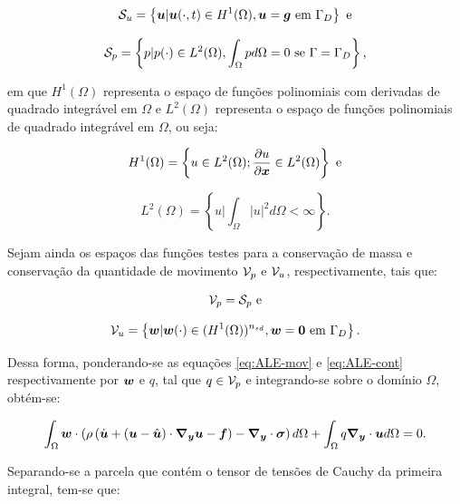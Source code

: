 \begin{equation}
    \mathcal{S}_u=\left\{\boldsymbol{u}|\boldsymbol{u}(\cdot,t)\in H^1(\Omega),\boldsymbol{u}=\boldsymbol{g}\text{ em }\Gamma_D\right\}\text{ e}
\end{equation}

\begin{equation}
    \mathcal{S}_p=\left\{p|p(\cdot)\in L^2(\Omega),\int_\Omega{pd\Omega}=0\text{ se }\Gamma=\Gamma_D\right\}\text{,}
\end{equation}

\noindent em que $H^1(\Omega)$ representa o espaço de funções polinomiais com derivadas de quadrado integrável em $\Omega$ e $L^2(\Omega)$ representa o espaço de funções polinomiais de quadrado integrável em $\Omega$, ou seja:

\begin{equation}
    H^1(\Omega)=\left\{u\in L^2(\Omega);\frac{\partial{u}}{\partial{\boldsymbol{x}}}\in L^2(\Omega)\right\}\text{ e}
\end{equation}

\begin{equation}
    L^2(\Omega)=\left\{u\big|\int_\Omega{|u|^2d\Omega}<\infty\right\}\text{.}
\end{equation}

Sejam ainda os espaços das funções testes para a conservação de massa e conservação da quantidade de movimento $\mathcal{V}_p$ e $\mathcal{V}_u$, respectivamente, tais que:

\begin{equation}
    \mathcal{V}_p=\mathcal{S}_p\text{ e}
\end{equation}

\begin{equation}
    \mathcal{V}_u=\left\{\boldsymbol{w}|\boldsymbol{w}(\cdot)\in(H^1(\Omega))^{n_{sd}},\boldsymbol{w}=\boldsymbol{0}\text{ em }\Gamma_D\right\}\text{.}
\end{equation}

Dessa forma, ponderando-se as equações \eqref{eq:ALE-mov} e \eqref{eq:ALE-cont} respectivamente por $\boldsymbol{w}$ e $q$, tal que $q\in\mathcal{V}_p$ e integrando-se sobre o domínio $\Omega$, obtém-se:

\begin{equation}
    \int_{\Omega}{\boldsymbol{w}\cdot\left({\rho\left({\dot{\boldsymbol{u}}+(\boldsymbol{u}-\hat{\boldsymbol{u}})\cdot\boldsymbol{\nabla_y}\boldsymbol{u}-\boldsymbol{f}}\right)-\boldsymbol{\nabla_y}\cdot\boldsymbol{\sigma}}\right) d\Omega}+\int_{\Omega}{q\boldsymbol{\nabla_y}\cdot\boldsymbol{u} d\Omega}=0\text{.}
\end{equation}

Separando-se a parcela que contém o tensor de tensões de Cauchy da primeira integral, tem-se que:

